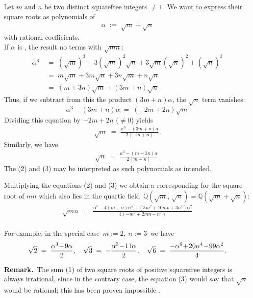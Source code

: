 \documentclass[12pt]{article}
\theoremstyle{definition}
\begin{document}
Let $m$ and $n$ be two distinct squarefree integers $\neq 1$.\, We want to express their square roots as polynomials of
\begin{align}
\alpha \;:=\; \sqrt{m}\!+\!\sqrt{n}
\end{align}
with rational coefficients.\\

If $\alpha$ is , the result  no terms with $\sqrt{mn}$:
\begin{align*}
\alpha^3 &\;=\; (\sqrt{m})^3+3(\sqrt{m})^2\sqrt{n}+3\sqrt{m}(\sqrt{n})^2+(\sqrt{n})^3\\ 
 &\;=\; m\sqrt{m}+3m\sqrt{n}+3n\sqrt{m}+n\sqrt{n}\\ 
 &\;=\; (m+3n)\sqrt{m}+(3m+n)\sqrt{n}
\end{align*}
Thus, if we subtract from this the product $(3m\!+\!n)\alpha$, the $\sqrt{n}$ term vanishes:
$$\alpha^3\!-\!(3m\!+\!n)\alpha \;=\; (-2m\!+\!2n)\sqrt{m}$$
Dividing this equation by $-2m\!+\!2n$ ($\neq 0$) yields
\begin{align}
\sqrt{m} \;=\; \frac{\alpha^3\!-\!(3m\!+\!n)\alpha}{2(-m\!+\!n)}.
\end{align}
Similarly, we have
\begin{align}
\sqrt{n} \;=\;\frac{\alpha^3\!-\!(m\!+\!3n)\alpha}{2(m\!-\!n)}.
\end{align}
The  (2) and (3) may be interpreted as such polynomials as intended.

Multiplying the equations (2) and (3) we obtain a corresponding  for the square root of $mn$ which also lies in the quartic field \,$\mathbb{Q}(\sqrt{m},\,\sqrt{n}) = \mathbb{Q}(\sqrt{m}\!+\!\sqrt{n})$:
\begin{align*}
\sqrt{mn} \;=\; \frac{\alpha^6\!-\!4(m\!+\!n)\alpha^4\!+\!(3m^2\!+\!10mn\!+\!3n^2)\alpha^2}{4(-m^2\!+\!2mn\!-\!n^2)}\\
\end{align*}


For example, in the special case \,$m := 2,\; n := 3$\, we have
$$\sqrt{2} \;=\; \frac{\alpha^3\!-\!9\alpha}{2}, \quad  \sqrt{3} \;=\; -\frac{\alpha^3\!-\!11\alpha}{2}, \quad 
 \sqrt{6} \;=\; \frac{-\alpha^6\!+\!20\alpha^4\!-\!99\alpha^2}{4}.\\$$

\textbf{Remark.}\, The sum (1) of two square roots of positive squarefree integers is always irrational, since in the contrary case, the equation (3) would say that $\sqrt{n}$ would be rational; this has been proven impossible .






\end{document}
